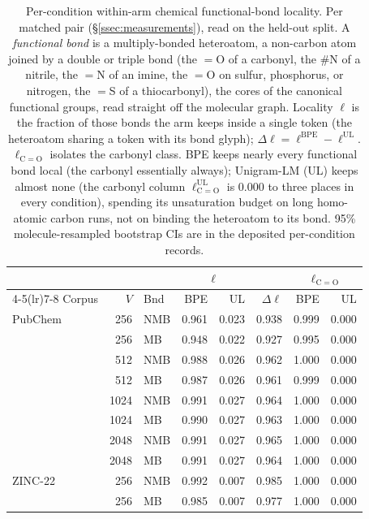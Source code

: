 \begin{table}[htbp]
  \centering
  \caption{Per-condition within-arm chemical functional-bond locality. Per matched pair (\S\ref{ssec:measurements}), read on the held-out split. A \emph{functional bond} is a multiply-bonded heteroatom, a non-carbon atom joined by a double or triple bond (the $=$O of a carbonyl, the $\#$N of a nitrile, the $=$N of an imine, the $=$O on sulfur, phosphorus, or nitrogen, the $=$S of a thiocarbonyl), the cores of the canonical functional groups, read straight off the molecular graph. Locality $\ell$ is the fraction of those bonds the arm keeps inside a single token (the heteroatom sharing a token with its bond glyph); $\Delta\ell{=}\ell^{\mathrm{BPE}}{-}\ell^{\mathrm{UL}}$. $\ell_{\mathrm{C{=}O}}$ isolates the carbonyl class. BPE keeps nearly every functional bond local (the carbonyl essentially always); Unigram-LM (UL) keeps almost none (the carbonyl column $\ell^{\mathrm{UL}}_{\mathrm{C{=}O}}$ is $0.000$ to three places in every condition), spending its unsaturation budget on long homo-atomic carbon runs, not on binding the heteroatom to its bond. 95\% molecule-resampled bootstrap CIs are in the deposited per-condition records.}
  \label{tab:results-fg-alignment}
  \footnotesize
  \begin{tabular}{@{}l r l r r r r r@{}}
    \toprule
    & & & \multicolumn{2}{c}{$\ell$} & & \multicolumn{2}{c}{$\ell_{\mathrm{C{=}O}}$} \\
    \cmidrule(lr){4-5}\cmidrule(lr){7-8}
    Corpus & $V$ & Bnd & BPE & UL & $\Delta\ell$ & BPE & UL \\
    \midrule
    PubChem & 256 & NMB & 0.961 & 0.023 & 0.938 & 0.999 & 0.000 \\
     & 256 & MB & 0.948 & 0.022 & 0.927 & 0.995 & 0.000 \\
     & 512 & NMB & 0.988 & 0.026 & 0.962 & 1.000 & 0.000 \\
     & 512 & MB & 0.987 & 0.026 & 0.961 & 0.999 & 0.000 \\
     & 1024 & NMB & 0.991 & 0.027 & 0.964 & 1.000 & 0.000 \\
     & 1024 & MB & 0.990 & 0.027 & 0.963 & 1.000 & 0.000 \\
     & 2048 & NMB & 0.991 & 0.027 & 0.965 & 1.000 & 0.000 \\
     & 2048 & MB & 0.991 & 0.027 & 0.964 & 1.000 & 0.000 \\
    \addlinespace
    ZINC-22 & 256 & NMB & 0.992 & 0.007 & 0.985 & 1.000 & 0.000 \\
     & 256 & MB & 0.985 & 0.007 & 0.977 & 1.000 & 0.000 \\

\end{tabular}
\end{table}
